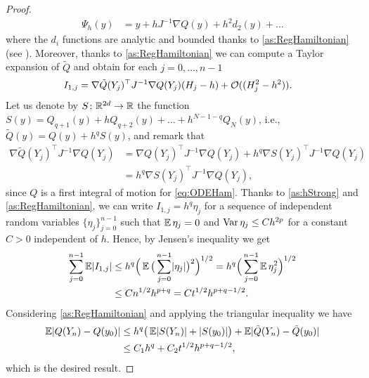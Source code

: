 \documentclass[final,onefignum,onetabnum]{siamonline171218}
\begin{document}
\begin{proof}
	\begin{equation}
	\begin{aligned}
	\Psi_h(y) &= y + h J^{-1}\nabla Q(y) + h^2 d_2(y) + \ldots
	\end{aligned}
	\end{equation}
	where the $d_i$ functions are analytic and bounded thanks to \cref{as:RegHamiltonian} (see \cite[Theorem IX.7.2]{HLW06}).  Moreover, thanks to \cref{as:RegHamiltonian} we can compute a Taylor expansion of $\tilde Q$ and obtain for each $j = 0, \ldots, n-1$
	\begin{equation}
	\begin{aligned}
	I_{1,j} &= \nabla \tilde Q(Y_j)^\top J^{-1} \nabla Q(Y_j)(H_j - h) + \mathcal{O}((H_j^2 - h^2)).
	\end{aligned}
	\end{equation}
	Let us denote by $S \colon \mathbb{R}^{2d} \to \mathbb{R}$ the function $S(y) = Q_{q+1}(y) + h Q_{q+2}(y) + \ldots + h^{N-1-q} Q_N(y)$, i.e., $\tilde Q(y) = Q(y) + h^q S(y)$, and remark that
	\begin{equation}
	\begin{aligned}
	\nabla \tilde Q(Y_j)^\top J^{-1} \nabla Q(Y_j) &= \nabla Q(Y_j)^\top J^{-1} \nabla Q(Y_j) + h^q \nabla S(Y_j)^\top J^{-1} \nabla Q(Y_j) \\
	&= h^q \nabla S(Y_j)^\top J^{-1} \nabla Q(Y_j),
	\end{aligned}
	\end{equation}
	since $Q$ is a first integral of motion for \eqref{eq:ODEHam}. Thanks to \cref{as:hStrong} and \cref{as:RegHamiltonian}, we can write $I_{1, j} = h^q \eta_j$ for a sequence of independent random variables $\{\eta_j\}_{j=0}^{n-1}$ such that $\operatorname{\mathbb{E}} \eta_j = 0$ and $\operatorname{Var} \eta_j \leq Ch^{2p}$ for a constant $C > 0$ independent of $h$. Hence, by Jensen's inequality we get
	\begin{equation}
	\begin{aligned}
	\sum_{j=0}^{n-1} \operatorname{\mathbb{E}} \lvert I_{1,j}\rvert &\leq h^q \Big(\operatorname{\mathbb{E}} \big(\sum_{j=0}^{n-1}\lvert\eta_j\rvert \big)^2\Big)^{1/2} = h^q\Big(\sum_{j=0}^{n-1}\operatorname{\mathbb{E}} \eta_j^2\Big)^{1/2} \\
	&\leq C n^{1/2}h^{p+q} = C t^{1/2}h^{p+q-1/2}.
	\end{aligned}	
	\end{equation}
	Considering \cref{as:RegHamiltonian} and applying the triangular inequality we have
	\begin{equation}
	\begin{aligned}
	\operatorname{\mathbb{E}}\lvert Q(Y_n) - Q(y_0)\rvert &\leq h^q \big(\operatorname{\mathbb{E}}\lvert S(Y_n)\rvert + \lvert S(y_0)\rvert\big) + \operatorname{\mathbb{E}} \lvert\tilde Q(Y_n) - \tilde Q(y_0)\rvert\\
	&\leq C_1h^q + C_2 t^{1/2}h^{p+q-1/2},
	\end{aligned}
	\end{equation}
	which is the desired result.
\end{proof}
\end{document}
